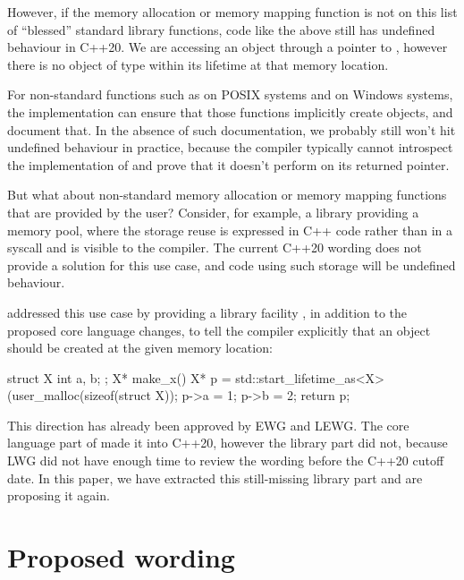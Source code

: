 However, if the memory allocation or memory mapping function is not on this list of ``blessed'' standard library functions, code like the above still has undefined behaviour in C++20. We are accessing an object through a pointer to , however there is no object of type  within its lifetime at that memory location.

For non-standard functions such as  on POSIX systems and  on Windows systems, the implementation can ensure that those functions implicitly create objects, and document that. In the absence of such documentation, we probably still won't hit undefined behaviour in practice, because the compiler typically cannot introspect the implementation of  and prove that it doesn't perform  on its returned pointer.

But what about non-standard memory allocation or memory mapping functions that are provided by the user? Consider, for example, a library providing a memory pool, where the storage reuse is expressed in C++ code rather than in a syscall and is visible to the compiler. The current C++20 wording does not provide a solution for this use case, and code using such storage will be undefined behaviour.

\cite{P0593R6} addressed this use case by providing a library facility , in addition to the proposed core language changes, to tell the compiler explicitly that an object should be created at the given memory location:

\begin{codeblock}
struct X { int a, b; };
X* make_x() {
  X* p = std::start_lifetime_as<X>(user_malloc(sizeof(struct X));
  p->a = 1;
  p->b = 2;
  return p;
}
\end{codeblock}

This direction has already been approved by EWG and LEWG. The core language part of \cite{P0593R6} made it into C++20, however the library part did not, because LWG did not have enough time to review the wording before the C++20 cutoff date. In this paper, we have extracted this still-missing library part and are proposing it again.


\section{Proposed wording}
\label{sec:wording}

